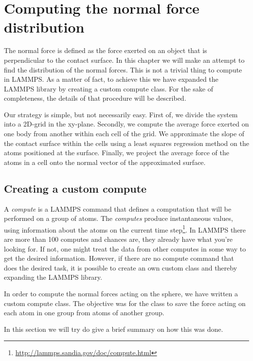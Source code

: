 \documentclass[twoside,english]{uiofysmaster}
\begin{document}
\chapter{Computing the normal force distribution}
The normal force is defined as the force exerted on an object that is perpendicular to the contact surface. 
In this chapter we will make an attempt to find the distribution of the normal forces. 
This is not a trivial thing to compute in LAMMPS. 
As a matter of fact, to achieve this we have expanded the LAMMPS library by creating a custom compute class. 
For the sake of completeness, the details of that procedure will be described. 

Our strategy is simple, but not necessarily easy. 
First of, we divide the system into a 2D-grid in the xy-plane. 
Secondly,  we compute the average force exerted on one body from another within each cell of the grid. 
We approximate the slope of the contact surface within the cells using a least squares regression method on the atoms positioned at the surface. 
Finally, we project the average force of the atoms in a cell onto the normal vector of the approximated surface.


\section{Creating a custom compute}
A \textit{compute} is a LAMMPS command that defines a computation that will be performed on a group of atoms. 
The \textit{computes} produce instantaneous values, using information about the atoms on the current time step\footnote{\href{ http://lammps.sandia.gov/doc/compute.html}{ http://lammps.sandia.gov/doc/compute.html}}.
In LAMMPS there are more than 100 computes and chances are, they already have what you're looking for. If not, one might treat the data from other computes in some way to get the desired information. However, if there are no compute command that does the desired task, it is possible to create an own custom class and thereby expanding the LAMMPS library.  

In order to compute the normal forces acting on the sphere, we have written a custom compute class. 
The objective was for the class to save the force acting on each atom in one group from atoms of another group. 

In this section we will try do give a brief summary on how this was done.
\end{document}

